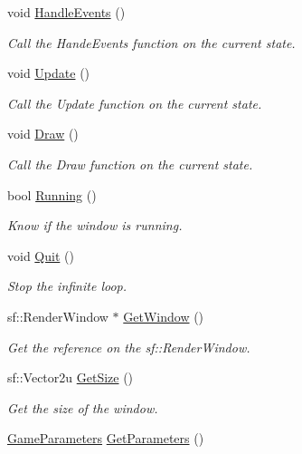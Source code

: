 \begin{DoxyCompactItemize}
void \mbox{\hyperlink{classsfmlbe_1_1_game_manager_a0fd18d663571814d08d14e6c1ed3191a}{Handle\+Events}} ()
\begin{DoxyCompactList}\small\item\em Call the Hande\+Events function on the current state. \end{DoxyCompactList}\item 
void \mbox{\hyperlink{classsfmlbe_1_1_game_manager_a895a0457b48b9ccd36194a345b04b547}{Update}} ()
\begin{DoxyCompactList}\small\item\em Call the Update function on the current state. \end{DoxyCompactList}\item 
void \mbox{\hyperlink{classsfmlbe_1_1_game_manager_a6c8377c22718038d018ebe7e26d3bdc3}{Draw}} ()
\begin{DoxyCompactList}\small\item\em Call the Draw function on the current state. \end{DoxyCompactList}\item 
bool \mbox{\hyperlink{classsfmlbe_1_1_game_manager_abf3416b7fcada3b78823e3e1709922d0}{Running}} ()
\begin{DoxyCompactList}\small\item\em Know if the window is running. \end{DoxyCompactList}\item 
void \mbox{\hyperlink{classsfmlbe_1_1_game_manager_a17d8f897440b021f4eb1884cb3a5d521}{Quit}} ()
\begin{DoxyCompactList}\small\item\em Stop the infinite loop. \end{DoxyCompactList}\item 
sf\+::\+Render\+Window $\ast$ \mbox{\hyperlink{classsfmlbe_1_1_game_manager_af1a92deae211f03579cd4d262c43ca17}{Get\+Window}} ()
\begin{DoxyCompactList}\small\item\em Get the reference on the sf\+::\+Render\+Window. \end{DoxyCompactList}\item 
sf\+::\+Vector2u \mbox{\hyperlink{classsfmlbe_1_1_game_manager_aded3ad1e2a432e457f523f70b71d913a}{Get\+Size}} ()
\begin{DoxyCompactList}\small\item\em Get the size of the window. \end{DoxyCompactList}\item 
\mbox{\hyperlink{structsfmlbe_1_1_game_parameters}{Game\+Parameters}} \mbox{\hyperlink{classsfmlbe_1_1_game_manager_a53239ca0e97052fc512ab973102ca6cb}{Get\+Parameters}} ()

\end{DoxyCompactItemize}
